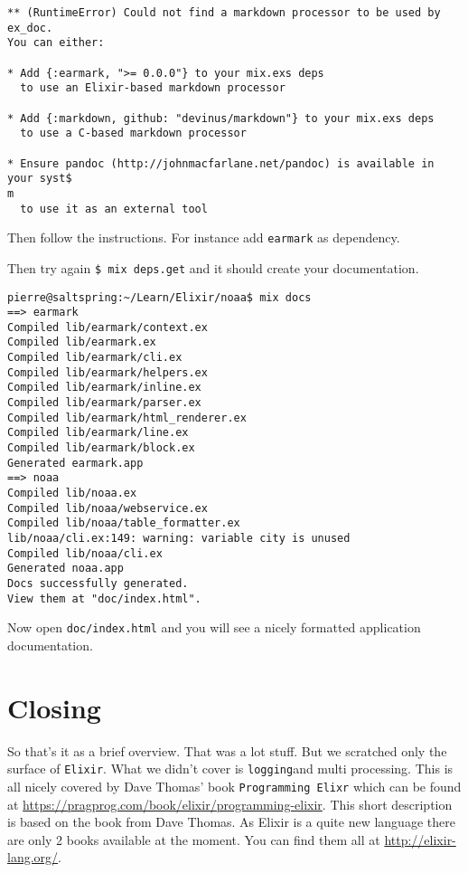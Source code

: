 \documentclass[10pt, a4paper]{article}
\newcommand{\includecode}[3]{}
\begin{document}
\begin{verbatim}
** (RuntimeError) Could not find a markdown processor to be used by ex_doc.
You can either:

* Add {:earmark, ">= 0.0.0"} to your mix.exs deps
  to use an Elixir-based markdown processor

* Add {:markdown, github: "devinus/markdown"} to your mix.exs deps
  to use a C-based markdown processor

* Ensure pandoc (http://johnmacfarlane.net/pandoc) is available in your syst$
m
  to use it as an external tool
\end{verbatim}

Then follow the instructions. For instance add \texttt{earmark} as 
dependency.

\includecode{mix.exs}{lst:mix4}{listings/mix4.exs}

Then try again \texttt{\$ mix deps.get} and it should create your 
documentation.

\begin{verbatim}
pierre@saltspring:~/Learn/Elixir/noaa$ mix docs
==> earmark
Compiled lib/earmark/context.ex
Compiled lib/earmark.ex
Compiled lib/earmark/cli.ex
Compiled lib/earmark/helpers.ex
Compiled lib/earmark/inline.ex
Compiled lib/earmark/parser.ex
Compiled lib/earmark/html_renderer.ex
Compiled lib/earmark/line.ex
Compiled lib/earmark/block.ex
Generated earmark.app
==> noaa
Compiled lib/noaa.ex
Compiled lib/noaa/webservice.ex
Compiled lib/noaa/table_formatter.ex
lib/noaa/cli.ex:149: warning: variable city is unused
Compiled lib/noaa/cli.ex
Generated noaa.app
Docs successfully generated.
View them at "doc/index.html".
\end{verbatim}

Now open \texttt{doc/index.html} and you will see a nicely formatted 
application documentation.

\section{Closing}
So that's it as a brief overview. That was a lot stuff. But we scratched
only the surface of \texttt{Elixir}. What we didn't cover is 
\texttt{logging}and multi processing. This is all nicely covered by 
Dave Thomas' book \texttt{Programming Elixr} which can be found at 
\url{https://pragprog.com/book/elixir/programming-elixir}. This short 
description is based on the book from Dave Thomas. As Elixir is a quite new 
language there are only 2 books
available at the moment. You can find them all at \url{http://elixir-lang.org/}. 
\end{document}

